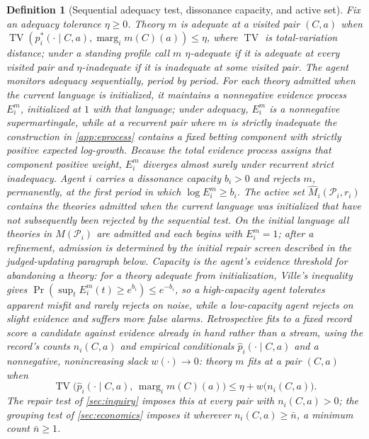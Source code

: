 \documentclass[11pt]{article}
\newtheorem{definition}[assumption]{Definition}
\theoremstyle{definition}
\newcommand{\TV}{\operatorname{TV}}
\newcommand{\marg}[1]{\operatorname{marg}_{#1}}
\begin{document}
\begin{definition}[Sequential adequacy test, dissonance capacity, and active set]
\label{def:test}
Fix an adequacy tolerance $\eta\ge0$.
Theory $m$ is \emph{adequate} at a visited pair $(C,a)$ when $\TV\!\left(p_i^{*}(\cdot\mid C,a),\marg{i}m(C)(a)\right)\le\eta$, where $\TV$ is total-variation distance; under a standing profile call $m$ \emph{$\eta$-adequate} if it is adequate at every visited pair and \emph{$\eta$-inadequate} if it is inadequate at some visited pair.
The agent monitors adequacy \emph{sequentially}, period by period.
For each theory admitted when the current language is initialized, it maintains a nonnegative \emph{evidence process} $E_i^{m}$, initialized at $1$ with that language; under adequacy, $E_i^{m}$ is a nonnegative supermartingale, while at a recurrent pair where $m$ is strictly inadequate the construction in \cref{app:eprocess} contains a fixed betting component with strictly positive expected log-growth.
Because the total evidence process assigns that component positive weight, $E_i^{m}$ diverges almost surely under recurrent strict inadequacy.
Agent $i$ carries a \emph{dissonance capacity} $b_i>0$ and \emph{rejects} $m$, permanently, at the first period in which $\log E_i^{m}\ge b_i$.
The \emph{active set} $\widehat M_i(\mathcal P_i,r_i)$ contains the theories admitted when the current language was initialized that have not subsequently been rejected by the sequential test.
On the initial language all theories in $M(\mathcal P_i)$ are admitted and each begins with $E_i^m=1$; after a refinement, admission is determined by the initial repair screen described in the judged-updating paragraph below.
Capacity is the agent's evidence threshold for abandoning a theory: for a theory adequate from initialization, Ville's inequality gives $\Pr(\sup_t E_i^m(t)\ge e^{b_i})\le e^{-b_i}$, so a high-capacity agent tolerates apparent misfit and rarely rejects on noise, while a low-capacity agent rejects on slight evidence and suffers more false alarms.
Retrospective fits to a \emph{fixed} record score a candidate against evidence already in hand rather than a stream, using the record's counts $n_i(C,a)$ and empirical conditionals $\hat p_i(\cdot\mid C,a)$ and a nonnegative, nonincreasing slack $w(\cdot)\to0$: theory $m$ \emph{fits} at a pair $(C,a)$ when
\begin{equation}
\TV\bigl(\hat p_i(\cdot\mid C,a),\,\marg{i}m(C)(a)\bigr)
\le
\eta+w\bigl(n_i(C,a)\bigr).
\label{eq:test}
\end{equation}
The repair test of \cref{sec:inquiry} imposes this at every pair with $n_i(C,a)>0$; the grouping test of \cref{sec:economics} imposes it wherever $n_i(C,a)\ge\bar n$, a minimum count $\bar n\ge1$.
\end{definition}
\end{document}
